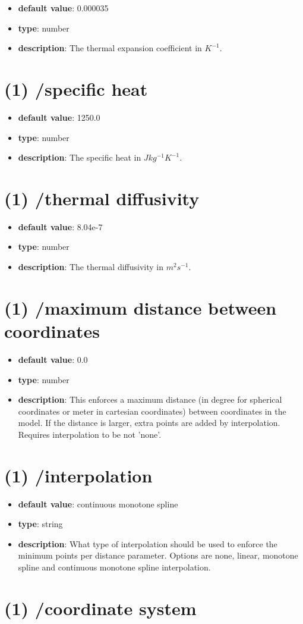 \begin{itemize}[leftmargin=1em]\item {\bf default value}: 0.000035
\item {\bf type}: number
\item {\bf description}: The thermal expansion coefficient in $K^{-1}$.
\end{itemize}\section{(1) /specific heat}
\begin{itemize}[leftmargin=1em]\item {\bf default value}: 1250.0
\item {\bf type}: number
\item {\bf description}: The specific heat in $J kg^{-1} K^{-1}.$
\end{itemize}\section{(1) /thermal diffusivity}
\begin{itemize}[leftmargin=1em]\item {\bf default value}: 8.04e-7
\item {\bf type}: number
\item {\bf description}: The thermal diffusivity in $m^{2} s^{-1}$.
\end{itemize}\section{(1) /maximum distance between coordinates}
\begin{itemize}[leftmargin=1em]\item {\bf default value}: 0.0
\item {\bf type}: number
\item {\bf description}: This enforces a maximum distance (in degree for spherical coordinates or meter in cartesian coordinates) between coordinates in the model. If the distance is larger, extra points are added by interpolation. Requires interpolation to be not 'none'.
\end{itemize}\section{(1) /interpolation}
\begin{itemize}[leftmargin=1em]\item {\bf default value}: continuous monotone spline
\item {\bf type}: string
\item {\bf description}: What type of interpolation should be used to enforce the minimum points per distance parameter. Options are none, linear, monotone spline and continuous monotone spline interpolation.
\end{itemize}\section{(1) /coordinate system}
